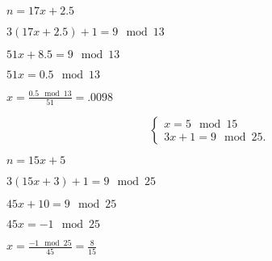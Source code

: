 \documentclass[10pt]{book}
\begin{document}
\begin{mdSnippets}
\begin{mdInlineSnippet}[02fe841315e9e253433d5f3846bc614b]%
$n = 17x + 2.5$\end{mdInlineSnippet}%
\begin{mdInlineSnippet}[2b33c61271e0d71fa4f74a87634783bd]%
$3(17x + 2.5) + 1 = 9 \mod 13$\end{mdInlineSnippet}%
\begin{mdInlineSnippet}[a506ba54934af15f18c55c384c07c790]%
$51x + 8.5 = 9 \mod 13$\end{mdInlineSnippet}%
\begin{mdInlineSnippet}[f7ce0882057924eb45f6f714e8d4c0e2]%
$51x = 0.5 \mod 13$\end{mdInlineSnippet}%
\begin{mdInlineSnippet}%
$x = \frac{0.5 \mod 13} {51} = .0098$\end{mdInlineSnippet}%
\begin{mdDisplaySnippet}[b24687b8eb20387e6ce8b088003a7f25]%
\[%
\left\{\begin{array}{l}
x = 5 \mod 15\\
3x + 1 = 9 \mod 25.
\end{array}\right.
\]%
\end{mdDisplaySnippet}%
\begin{mdInlineSnippet}%
$n = 15x + 5$\end{mdInlineSnippet}%
\begin{mdInlineSnippet}[0aa0d4ae68928fb798270e4d22cf8309]%
$3(15x + 3) + 1 = 9 \mod 25$\end{mdInlineSnippet}%
\begin{mdInlineSnippet}%
$45x + 10 = 9 \mod 25$\end{mdInlineSnippet}%
\begin{mdInlineSnippet}%
$45x = -1 \mod 25$\end{mdInlineSnippet}%
\begin{mdInlineSnippet}[7f0bc399fe3d9f7fbe0884fb1b25f6e3]%
$x = \frac{-1 \mod 25} {45} = \frac{8} {15}$\end{mdInlineSnippet}%
\begin{mdInlineSnippet}%

\end{mdInlineSnippet}
\end{mdSnippets}
\end{document}
